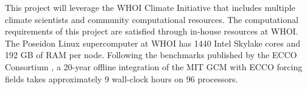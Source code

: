 \documentclass[authoryear,round,12pt]{article}
\begin{document}



This project will leverage the WHOI Climate Initiative that includes multiple climate scientists and community computational resources. The computational requirements of this project are satisfied through in-house resources at WHOI. The Poseidon Linux supercomputer at WHOI has 1440 Intel Skylake cores and 192 GB of RAM per node. Following the benchmarks published by the ECCO Consortium \citep{Forget-Campin-2015:ECCO}, a 20-year offline integration of the MIT GCM with ECCO forcing fields takes approximately 9 wall-clock hours on 96 processors.

%
\end{document}
